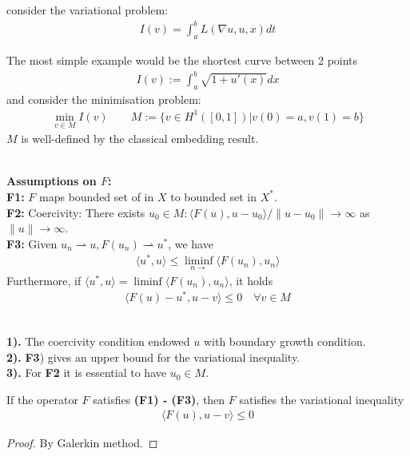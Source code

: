 consider the variational problem:
\begin{align*}
	I(v) = \int_a^b L( \nabla u, u, x) dt 
\end{align*}

The most simple example would be the shortest curve between 2 points
\begin{align*}
	I(v) := \int_a^b \sqrt{1 + u'(x)} dx  
\end{align*}
and consider the minimisation problem:
\begin{align*}
	\min_{v \in M} I(v) \qquad M := \{ v \in H^1([0, 1]) | v(0) = a, v(1) = b \}
\end{align*}
$M$ is well-defined by the classical embedding result.

\quad\\
\textbf{Assumptions on $F$:}\\
\textbf{F1:} $F$ maps bounded set of in $X$ to bounded set in $X^*$.\\
\textbf{F2:} Coercivity: There exists $u_0 \in M: \langle F(u), u - u_0 \rangle / \|u - u_0\| \rightarrow \infty$ as $\|u \| \rightarrow \infty$. \\
\textbf{F3:} Given $u_n \rightharpoonup u, F(u_n) \rightharpoonup u^*$, we have
\begin{align*}
	\langle u^*, u \rangle \le \liminf_{n \rightarrow } \langle F(u_n), u_n \rangle 
\end{align*}
Furthermore, if $\langle u^*, u \rangle = \liminf \langle F(u_n), u_n \rangle$, it holds
\begin{align*}
	\langle F(u) - u^*, u - v \rangle \le 0  \quad \forall v \in M
\end{align*}
\begin{remark}
\quad\\
\textbf{1).} The coercivity condition endowed $u$ with boundary growth condition.\\
\textbf{2).} \textbf{F3}) gives an upper bound for the variational inequality. \\
\textbf{3).} For \textbf{F2} it is essential to have $u_0 \in M$.
\end{remark}

\begin{example}
\end{example}



\begin{theorem}
	If the operator $F$ satisfies \textbf{(F1) - (F3)}, then $F$ satisfies the variational inequality
	\begin{align*}
		\langle F(u), u - v \rangle \le 0
	\end{align*} 
\end{theorem}
\begin{proof}
	By Galerkin method. 
\end{proof}


